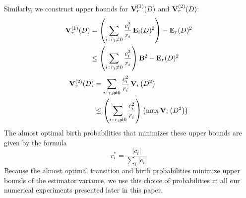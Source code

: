 \documentclass{elsart}
\theoremstyle{remark}
\theoremstyle{definition}
\theoremstyle{proof}
\begin{document}
        Similarly, we construct upper bounds for ${\bf V}_r^{(1)}(D)$ and
        ${\bf V}_r^{(2)}(D)$:
        \[ \begin{split}
            {\bf V}_r^{(1)}(D)
            &= \left(\sum_{i\,:\,r_i\ne0} \frac{c_i^2}{r_i}\,
                     {\bf E}_i(D)^2\right) - {\bf E}_r(D)^2 \\
            &\le \left( \sum_{i\,:\,r_i\ne0} \frac{c_i^2}{r_i}\right)
                 \mathbf{B}^2 - {\bf E}_r(D)^2
        \end{split} \]
        \[ \begin{split}
            {\bf V}_r^{(2)}(D) &= 
                \sum_{i\,:\,r_i\ne0} \frac{c_i^2}{r_i}\,
                {\bf V}_i\left(D^2\right)  \\
            &\le \left( \sum_{i\,:\,r_i\ne0} \frac{c_i^2}{r_i}\right)
                \left(\max {\bf V}_i\left(D^2\right)\right)
        \end{split} \]
        The almost optimal birth probabilities that minimizes these upper
        bounds are given by the formula
        \begin{equation} \label{birth}
            r_i^* = \frac{|c_i|}{\sum_i|c_i|}
        \end{equation}
        Because the almost optimal transition and birth probabilities
        minimize upper bounds of the estimator variance, we use this
        choice of probabilities in all our numerical experiments presented
        later in this paper.

    
\end{document}
